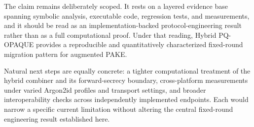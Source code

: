 \documentclass[conference]{IEEEtran}
\begin{document}
The claim remains deliberately scoped. It rests on a layered evidence base spanning symbolic analysis, executable code, regression tests, and measurements, and it should be read as an implementation-backed protocol-engineering result rather than as a full computational proof. Under that reading, Hybrid PQ-OPAQUE provides a reproducible and quantitatively characterized fixed-round migration pattern for augmented PAKE.

Natural next steps are equally concrete: a tighter computational treatment of the hybrid combiner and its forward-secrecy boundary, cross-platform measurements under varied Argon2id profiles and transport settings, and broader interoperability checks across independently implemented endpoints. Each would narrow a specific current limitation without altering the central fixed-round engineering result established here.
\end{document}
